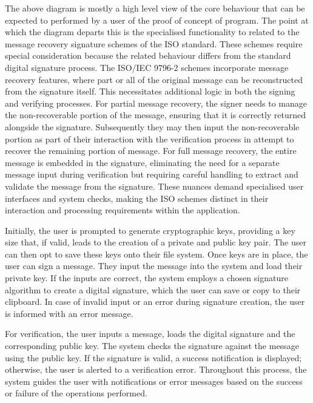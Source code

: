 \documentclass[]{final_report}
\theoremstyle{definition}
\begin{document}
The above diagram is mostly a high level view of the core behaviour that can be expected to performed by a user of the proof of concept of program. The point at which the diagram departs this is the specialised functionality to related to the message recovery signature schemes of the ISO standard. These schemes require special consideration because the related behaviour differs from the standard digital signature process. The ISO/IEC 9796-2 schemes incorporate message recovery features, where part or all of the original message can be reconstructed from the signature itself. This necessitates additional logic in both the signing and verifying processes. For partial message recovery, the signer needs to manage the non-recoverable portion of the message, ensuring that it is correctly returned alongside the signature. Subsequently they may then input the non-recoverable portion as part of their interaction with the verification process in attempt to recover the remaining portion of message. For full message recovery, the entire message is embedded in the signature, eliminating the need for a separate message input during verification but requiring careful handling to extract and validate the message from the signature. These nuances demand specialised user interfaces and system checks, making the ISO schemes distinct in their interaction and processing requirements within the application.

Initially, the user is prompted to generate cryptographic keys, providing a key size that, if valid, leads to the creation of a private and public key pair. The user can then opt to save these keys onto their file system.
Once keys are in place, the user can sign a message. They input the message into the system and load their private key. If the inputs are correct, the system employs a chosen signature algorithm to create a digital signature, which the user can save or copy to their clipboard. In case of invalid input or an error during signature creation, the user is informed with an error message.

For verification, the user inputs a message, loads the digital signature and the corresponding public key. The system checks the signature against the message using the public key. If the signature is valid, a success notification is displayed; otherwise, the user is alerted to a verification error. Throughout this process, the system guides the user with notifications or error messages based on the success or failure of the operations performed.
\end{document}
